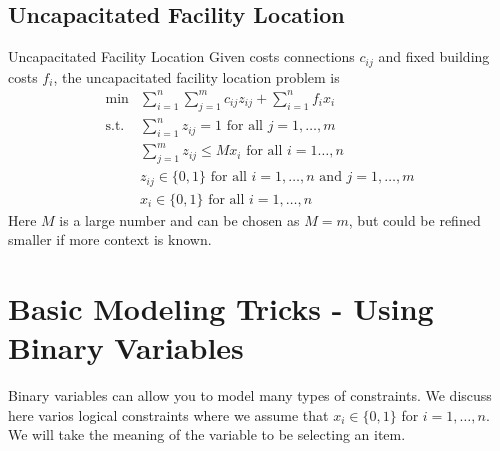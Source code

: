 \subsection{Uncapacitated Facility Location}

\begin{general}{Uncapacitated Facility Location}{\npcomplete}
Given costs connections $c_{ij}$ and fixed building costs $f_i$, the uncapacitated facility location problem is 
\begin{equation}
\begin{array}{rl}
\min & \displaystyle\sum_{i=1}^n\sum_{j=1}^mc_{ij}z_{ij}+\sum_{i=1}^nf_ix_i \\
\text{s.t.} & \displaystyle\sum_{i=1}^nz_{ij}=1 \text{ for all }j=1,\dots,m \\
& \displaystyle \sum_{j=1}^mz_{ij}\leqslant Mx_i\text{ for all }i=1\dots,n \\
&z_{ij}\in\{0,1\}\text{ for all }i=1,\dots,n \text{ and }j=1,\dots,m\\
&x_i\in\{0,1\}\text{ for all } i=1,\dots,n
\end{array}
\end{equation}
Here $M$ is a large number and can be chosen as $M = m$, but could be refined smaller if more context is known.
\end{general}


\section{Basic Modeling Tricks - Using Binary Variables}
Binary variables can allow you to model many types of constraints.  We discuss here varios logical constraints where we assume that $x_i \in \{0,1\}$ for $i=1, \dots, n$.  We will take the meaning of the variable to be selecting an item.

